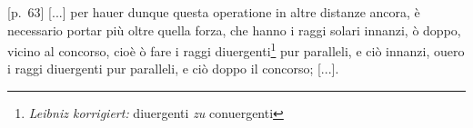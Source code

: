 \pstart {} [p.~63] [...] per hauer dunque questa operatione in altre distanze ancora, \`{e} necessario portar pi\`{u} oltre quella forza, che hanno i raggi solari innanzi, \`{o} doppo, vicino al concorso, cio\`{e} \`{o} fare i raggi diuergenti\footnote{\textit{Leibniz korrigiert:} diuergenti \textit{zu} conuergenti} pur paralleli, e ci\`{o} innanzi, ouero i raggi diuergenti pur paralleli, e ci\`{o} doppo il concorso; [...].